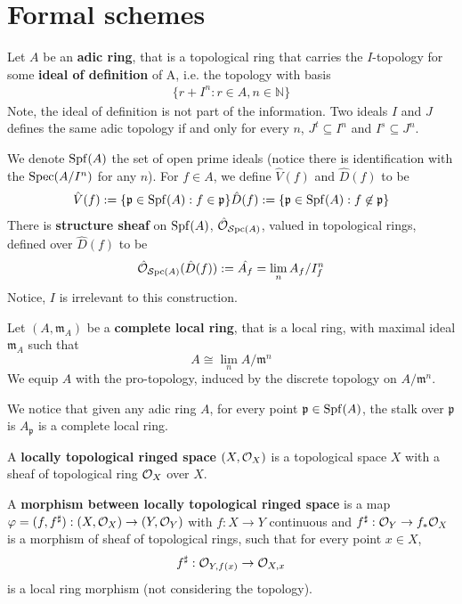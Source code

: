 \section{Formal schemes}\label{sec:algebraicgeometry-formalschemes}

\begin{definition}
    \cite{PGScholzeWeinstein}
    Let $A$ be an \textbf{adic ring}, that is a topological ring that carries the $I$-topology for some \textbf{ideal of definition} of A, i.e. the topology with basis
    \begin{align*}
        \{r + I^n: r\in A, n \in \mathbb{N}\}
    \end{align*}
    Note, the ideal of definition is not part of the information. Two ideals $I$ and $J$ defines the same adic topology if and only for every $n$, $J^t\subseteq I^n$ and $I^s\subseteq J^n$.

    We denote $\operatorname{\mathrm{Spf}}(A)$ the set of open prime ideals (notice there is identification with the $\operatorname{\mathrm{Spec}}(A/I^n)$ for any $n$). For $f\in A$, we define $\hat{V}(f)$ and $\hat{D}(f)$ to be
    \begin{align*}
        \hat{V}(f):=\{\mathfrak{p}\in \operatorname{\mathrm{Spf}}(A): f\in \mathfrak{p}\}
        \hat{D}(f):=\{\mathfrak{p}\in \operatorname{\mathrm{Spf}}(A): f\not \in \mathfrak{p}\}
    \end{align*}
    There is \textbf{structure sheaf} on $\operatorname{\mathrm{Spf}}(A)$, $\hat{\mathcal{O}}_{\operatorname{\mathcal{S}pc}(A)}$, valued in topological rings, defined over $\hat{D}(f)$ to be
    \[
    \hat{\mathcal{O}}_{\operatorname{\mathcal{S}pc}(A)}(\hat{D}(f)):=\hat{A_f}=\lim_n A_f/I_f^n
    \]
    Notice, $I$ is irrelevant to this construction.
\end{definition}

\begin{remark}
    Let $(A, \mathfrak{m}_A)$ be a \textbf{complete local ring}, that is a local ring, with maximal ideal $\mathfrak{m}_A$ such that 
    \[
    A\cong \lim_{n}A/\mathfrak{m}^n
    \]We equip $A$ with the pro-topology, induced by the discrete topology on $A/\mathfrak{m}^n$.

    We notice that given any adic ring $A$, for every point $\mathfrak{p}\in\operatorname{\mathrm{Spf}}(A)$, the stalk over $\mathfrak{p}$ is $A_{\mathfrak{p}}$ is a complete local ring.
\end{remark}

\begin{definition}
    A \textbf{locally topological ringed space} $(X, \mathcal{O}_X)$ is a topological space $X$ with a sheaf of topological ring $\mathcal{O}_X$ over $X$.
    
    A \textbf{morphism between locally topological ringed space} is a map $\varphi=(f, f^{\operatorname{\sharp}}): (X, \mathcal{O}_X)\to (Y, \mathcal{O}_Y)$ with $f:X\to Y$ continuous and $f^{\operatorname{\sharp}}: \mathcal{O}_Y\to f_*\mathcal{O}_X$ is a morphism of sheaf of topological rings, such that for every point $x\in X$,
    \[
    f^{\operatorname{\sharp}}: \mathcal{O}_{Y, f(x)}\to \mathcal{O}_{X,x}
    \]is a local ring morphism (not considering the topology).
\end{definition}

